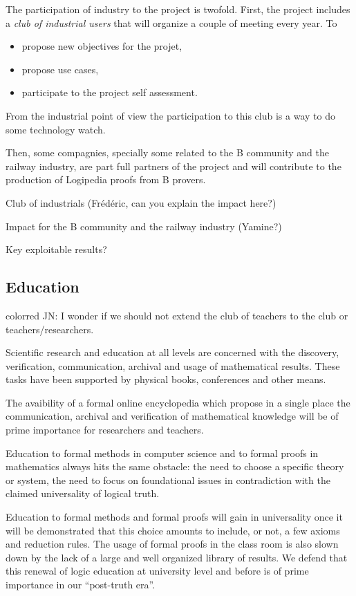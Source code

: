The participation of industry to the project is twofold. First,
the project includes a {\em club of industrial users} that will
organize a couple of meeting every year. To
\begin{itemize}
\item propose new objectives for the projet,
\item propose use cases,
\item participate to the project self assessment.
\end{itemize}

From the industrial point of view the participation to this club
is a way to do some technology watch. 

Then, some compagnies, specially some related to the {\sc B} community
and the railway industry, are part full partners of the project and
will contribute to the production of {\sc Logipedia} proofs from
{\sc B} provers. 

{\color{red} Club of industrials (Frédéric, can 
you explain the impact here?)}

{\color{red} Impact for the {\sc B} community and the railway industry
  (Yamine?)}

{\color{red} Key exploitable results?}

\subsection{Education}

{color{red} JN: I wonder if we should not extend the club of teachers to the club or teachers/researchers.}

Scientific research and education at all levels are concerned with the discovery, verification, communication, archival and usage of mathematical results.
These tasks have been supported by physical books, conferences and other means.

The avaibility of a formal online encyclopedia which propose in a single place the communication, archival and verification of mathematical  knowledge will be of prime importance for researchers and teachers.

Education to formal methods in computer science and to formal proofs
in mathematics always hits the same obstacle: the need to choose a
specific theory or system, the need to focus on foundational issues in contradiction with the claimed universality of logical truth. 

Education to formal methods and formal proofs will gain in universality once it will be demonstrated that this choice amounts to include, or not, a few axioms and reduction
rules. 
The usage of formal proofs in the class room is also slown down by the lack of a large and well organized library of results.
We defend that this renewal of logic education at university level and before is of prime importance in our ``post-truth era''.

